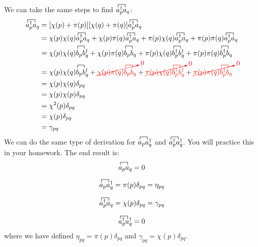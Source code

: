 \documentclass{article}
\newcommand{\fctr}{\contraction}
\newcommand{\dg}{\ensuremath{^\dagger} }
\def\cre#1{{\color{red}#1}}
\begin{document}
We can take the same steps to find $\fctr{}{a}{{}_p\dg}{a} a_p\dg a_q $: 
\begin{align*}
 \fctr{}{a}{{}_p\dg}{a}
 a_p\dg a_q  &= [\chi(p) + \pi(p)][\chi(q) + \pi(q)] \fctr{}{a}{{}_p\dg}{a} a_p\dg a_q \\
 &= \chi(p)\chi(q)\fctr{}{a}{{}_p\dg}{a} a_p\dg a_q + \chi(p) \pi(q) \fctr{}{a}{{}_p\dg}{a} a_p\dg a_q  +  \pi(p)\chi(q) \fctr{}{a}{{}_p\dg}{a} a_p\dg a_q  + 
 \pi(p) \pi(q) \fctr{}{a}{{}_p\dg}{a} a_p\dg a_q \\
 &= \chi(p)\chi(q)\fctr{}{b}{{}_p}{b} b_p b_q\dg + \chi(p) \pi(q) \fctr{}{b}{{}_p}{b} b_p b_q  +  \pi(p)\chi(q) \fctr{}{b}{{}_p\dg}{b} b_p\dg b_q\dg  + 
 \pi(p) \pi(q) \fctr{}{b}{{}_p\dg}{b} b_p\dg b_q \\
 &= \chi(p)\chi(q)\fctr{}{b}{{}_p}{b} b_p b_q\dg + \cre{\cancelto{0}{\chi(p) \pi(q) \fctr{}{b}{{}_p}{b} b_p b_q }} +  \cre{\cancelto{0}{ \pi(p)\chi(q) \fctr{}{b}{{}_p\dg}{b} b_p\dg b_q\dg}}  + 
 \cre{\cancelto{0}{\pi(p) \pi(q) \fctr{}{b}{{}_p\dg}{b} b_p\dg b_q }}\\
 &= \chi(p)\chi(q) \delta_{pq} \\
 &= \chi(p)\chi(p) \delta_{pq} \\
 &= \chi^2(p)\delta_{pq} \\
 &= \chi(p)\delta_{pq} \\
  &= \gamma_{pq}\\
\end{align*}
We can do the same type of derivation for $ \fctr{}{a}{{}_p}{a}a_p a_q\dg$ and  $\fctr{}{a}{{}_p}{a} a_p\dg a_q\dg$.
You will practice this in your homework.
The end result is: 
 $$
 \fctr{}{a}{{}_p}{a}
 a_p a_q  = 0 
 $$

 $$
 \fctr{}{a}{{}_p}{a}
 a_p a_q\dg = \pi(p)\delta_{pq} = \eta_{pq}
 $$

 $$
 \fctr{}{a}{{}_p}{a}
 a_p\dg a_q =   \chi(p)\delta_{pq} = \gamma_{pq}
 $$

 $$
 \fctr{}{a}{{}_p}{a}
 a_p\dg a_q\dg = 0
 $$
where we have defined $ \eta_{pq} = \pi(p)\delta_{pq}$ and $ \gamma_{pq} =  \chi(p)\delta_{pq} $. 
\end{document}
